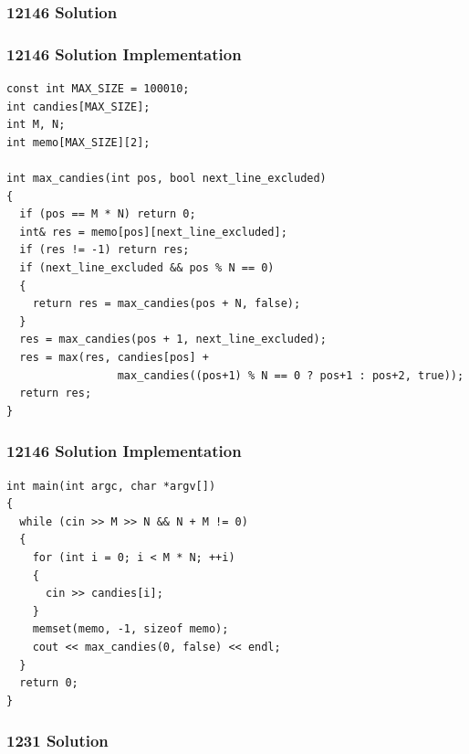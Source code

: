 \documentclass{beamer}
\newcommand{\uvalink}[2]{UVa Online Judge (http://uva.onlinejudge.org)
  problem number \href{#2}{\textcolor{blue}{#1}.}}
\newcounter{exo}
\newcommand{\exo}{
  \addtocounter{exo}{1}
  Exercice \arabic{exo}
}
\begin{document}
\ifanswers

\begin{frame}%
\frametitle{12146 Solution}

\end{frame}

\begin{frame}[fragile]
\frametitle{12146 Solution Implementation}

\scriptsize
\begin{lstlisting}
const int MAX_SIZE = 100010;
int candies[MAX_SIZE];
int M, N;
int memo[MAX_SIZE][2];

int max_candies(int pos, bool next_line_excluded)
{
  if (pos == M * N) return 0;
  int& res = memo[pos][next_line_excluded];
  if (res != -1) return res;
  if (next_line_excluded && pos % N == 0)
  {
    return res = max_candies(pos + N, false);
  }
  res = max_candies(pos + 1, next_line_excluded);
  res = max(res, candies[pos] +
                 max_candies((pos+1) % N == 0 ? pos+1 : pos+2, true));
  return res;
}
\end{lstlisting}

\end{frame}

\begin{frame}[fragile]
\frametitle{12146 Solution Implementation}

\scriptsize
\begin{lstlisting}
int main(int argc, char *argv[])
{
  while (cin >> M >> N && N + M != 0)
  {
    for (int i = 0; i < M * N; ++i)
    {
      cin >> candies[i];
    }
    memset(memo, -1, sizeof memo);
    cout << max_candies(0, false) << endl;
  }
  return 0;
}
\end{lstlisting}

\end{frame}

\fi


\ifanswers

\begin{frame}%
\frametitle{1231 Solution}

\end{frame}
\end{document}
